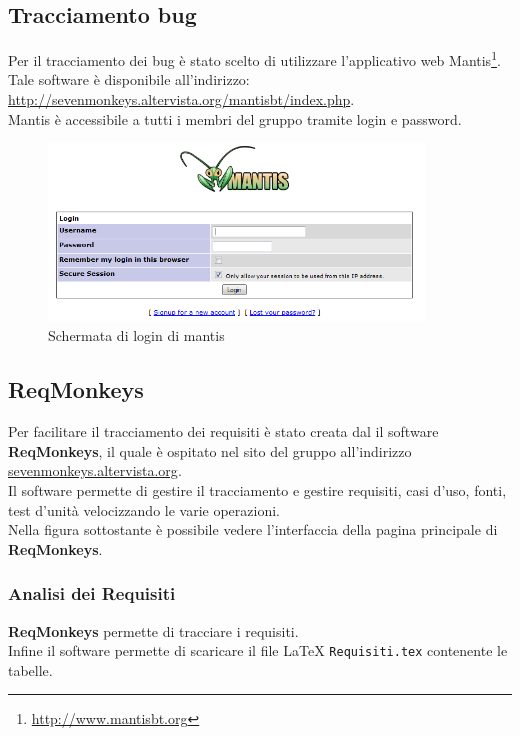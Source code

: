 \subsection{Tracciamento bug}
\label{tracciamento bug}
Per il tracciamento dei bug\glossario{} è stato scelto di utilizzare l'applicativo web Mantis\footnote{\url{http://www.mantisbt.org}}.
\\Tale software è disponibile all'indirizzo: \url{http://sevenmonkeys.altervista.org/mantisbt/index.php}.
\\Mantis è accessibile a tutti i membri del gruppo \authorName{} tramite login e password.
\begin{figure}
	\centering
	\includegraphics[width=10cm]{./content/Immagini/mantis.png}
	\caption{Schermata di login di mantis}
	\label{login_password}
\end{figure}

\subsection{ReqMonkeys}
\label{reqmonkeys}
Per facilitare il tracciamento dei requisiti è stato creata dal \administrator{} il software \textbf{ReqMonkeys}, il quale è ospitato nel sito del gruppo all'indirizzo \url{sevenmonkeys.altervista.org}.
\\Il software permette di gestire il tracciamento e gestire requisiti, casi d'uso, fonti, test d'unità velocizzando le varie operazioni.
\\Nella figura sottostante è possibile vedere l'interfaccia della pagina principale di \textbf{ReqMonkeys}. 

\subsubsection{Analisi dei Requisiti}
\label{analisi_requisiti_trax}
\textbf{ReqMonkeys} permette di tracciare i requisiti.
\\Infine il software permette di scaricare il file \LaTeX{} \verb!Requisiti.tex! contenente le tabelle.

